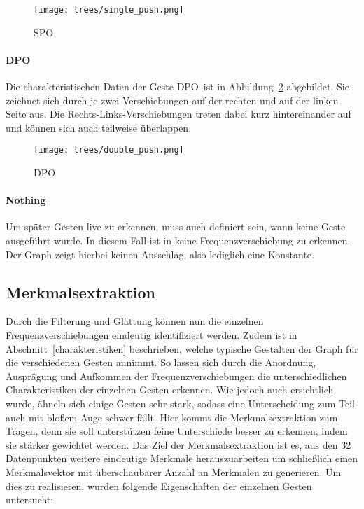 \begin{figure}[htbp] \centering
\texttt{[image: trees/single\_push.png]}
\caption{\acl{SPO}}
\label{fig:single_push}
\end{figure}

\paragraph*{\acl{DPO}}
Die charakteristischen Daten der Geste \glqq \acl{DPO}\grqq\ ist in Abbildung~\ref{fig:double_push} abgebildet. Sie zeichnet sich durch je zwei Verschiebungen auf der rechten und auf der linken Seite aus. Die Rechts-Links-Verschiebungen treten dabei kurz hintereinander auf und können sich auch teilweise überlappen. 

\begin{figure}[htbp] \centering
\texttt{[image: trees/double\_push.png]}
\caption{\acl{DPO}}
\label{fig:double_push}
\end{figure}

\paragraph*{Nothing}
Um später Gesten live zu erkennen, muss auch definiert sein, wann keine Geste ausgeführt wurde. In diesem Fall ist in keine Frequenzverschiebung zu erkennen. Der Graph zeigt hierbei keinen Ausschlag, also lediglich eine Konstante. 

\subsection{Merkmalsextraktion} \label{subsec:featureextraction}
Durch die Filterung und Glättung können nun die einzelnen Frequenzverschiebungen eindeutig identifiziert werden. Zudem ist in Abschnitt~\ref{charakteristiken} beschrieben, welche typische Gestalten der Graph für die verschiedenen Gesten annimmt. So lassen sich durch die Anordnung, Ausprägung und Aufkommen der Frequenzverschiebungen die unterschiedlichen Charakteristiken der einzelnen Gesten erkennen. Wie jedoch auch ersichtlich wurde, ähneln sich einige Gesten sehr stark, sodass eine Unterscheidung zum Teil auch mit bloßem Auge schwer fällt. Hier kommt die Merkmalsextraktion zum Tragen, denn sie soll unterstützen feine Unterschiede besser zu erkennen, indem sie stärker gewichtet werden. Das Ziel der Merkmalsextraktion ist es, aus den 32 Datenpunkten weitere eindeutige Merkmale herauszuarbeiten um schließlich einen Merkmalsvektor mit überschaubarer Anzahl an Merkmalen zu generieren. Um dies zu realisieren, wurden folgende Eigenschaften der einzelnen Gesten untersucht:

